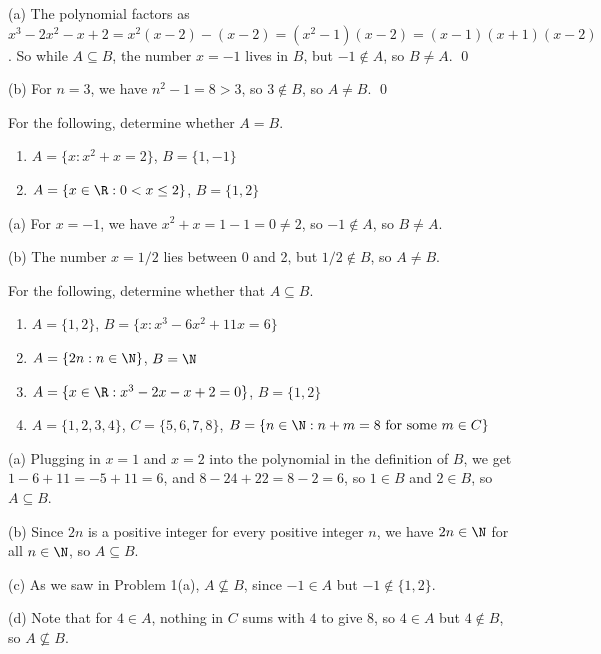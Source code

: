 \documentclass[a4paper,12pt]{article}
\begin{document}
\begin{solution}
	(a) The polynomial factors as $x^3 - 2x^2 - x + 2 = x^2(x-2) - (x-2) = (x^2 - 1)(x-2) = (x-1)(x+1)(x-2)$. So while $A \subseteq B$, the number $x = -1$ lives in $B$, but $-1 \not\in A$, so $B \neq A$. \qed
	
	(b) For $n = 3$, we have $n^2 - 1 = 8 > 3$, so $3 \not\in B$, so $A \neq B$. \qed 
\end{solution}

\begin{problem}
	For the following, determine whether $A = B$. 
	\begin{enumerate}[label=(\alph*)]
		\item $A = \{x : x^2 + x = 2\}$, $B = \{1,-1\}$
		\item $A = \{x \in \R : 0 < x \leq 2\}$, $B = \{1,2\}$
	\end{enumerate}
\end{problem}

\begin{solution}
	(a) For $x=-1$, we have $x^2 + x = 1 - 1 = 0 \neq 2$, so $-1 \not\in A$, so $B \neq A$. 
	
	(b) The number $x = 1/2$ lies between 0 and 2, but $1/2 \not\in B$, so $A \neq B$. 
\end{solution}

\begin{problem}
	For the following, determine whether that $A \subseteq B$. 
	\begin{enumerate}[label=(\alph*)]
		\item $A = \{1,2\}$, $B = \{x : x^3 - 6x^2 + 11x = 6\}$
		\item $A = \{2n : n \in \N\}$, $B = \N$
		\item $A = \{x \in \R : x^3 - 2x - x + 2 = 0\}$, $B =\{1,2\}$
		\item $A = \{1,2,3,4\}$, $C = \{5,6,7,8\}$, $B = \{n \in \N : n+m = 8 \textrm{ for some } m \in C\}$
	\end{enumerate} 
\end{problem}

\begin{solution}
	(a) Plugging in $x=1$ and $x=2$ into the polynomial in the definition of $B$, we get $1 - 6 + 11 = -5+11 = 6$, and $8 - 24 + 22 = 8-2 = 6$, so $1 \in B$ and $2 \in B$, so $A \subseteq B$. 
	
	(b) Since $2n$ is a positive integer for every positive integer $n$, we have $2n \in \N$ for all $n \in \N$, so $A \subseteq B$. 
	
	(c) As we saw in Problem 1(a), $A \not\subseteq B$, since $-1 \in A$ but $-1 \not\in \{1,2\}$. 
	
	(d) Note that for $4 \in A$, nothing in $C$ sums with $4$ to give $8$, so $4 \in A$ but $4 \not\in B$, so $A \not\subseteq B$. 
\end{solution}
\end{document}
